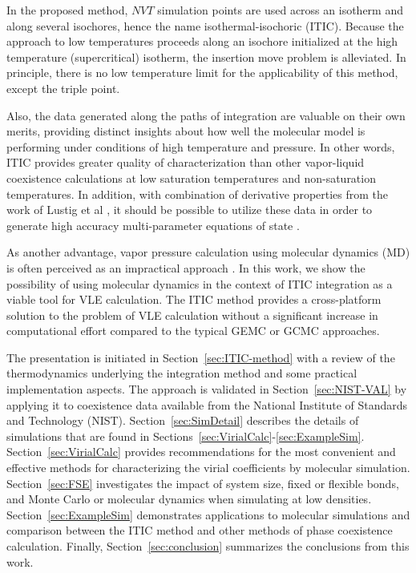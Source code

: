 \documentclass[5p,times]{elsarticle}
\begin{document}
In the proposed method, $NVT$ simulation points are used across an isotherm and along several isochores, hence the name isothermal-isochoric (ITIC). Because the approach to low temperatures proceeds along an isochore initialized at the high temperature (supercritical) isotherm, the insertion move problem is alleviated. In principle, there is no low temperature limit for the applicability of this method, except the triple point. 

Also, the data generated along the paths of integration are valuable on their own merits, providing distinct insights about how well the molecular model is performing under conditions of high temperature and pressure. In other words, ITIC provides greater quality of characterization than other vapor-liquid coexistence calculations at low saturation temperatures and non-saturation temperatures. In addition, with combination of derivative properties from the work of Lustig et al \cite{Lustig2015}, it should be possible to utilize these data in order to generate high accuracy multi-parameter equations of state \cite{Thol2016_LJ,Thol2016_siloxane,Thol2016_siloxane_first,Thol2017,Rutkai2013,Rutkai2015,Thol2015,Thol2015b}.

As another advantage, vapor pressure calculation using molecular dynamics (MD) is often perceived as an impractical approach \cite{Nieto-Draghi2015}. In this work, we show the possibility of using molecular dynamics in the context of ITIC integration as a viable tool for VLE calculation. The ITIC method provides a cross-platform solution to the problem of VLE calculation without a significant increase in computational effort compared to the typical GEMC or GCMC approaches.
 
The presentation is initiated in Section~\ref{sec:ITIC-method} with a review of the thermodynamics underlying the integration method and some practical implementation aspects. The approach is validated in Section~\ref{sec:NIST-VAL} by applying it to coexistence data available from the National Institute of Standards and Technology (NIST). Section~\ref{sec:SimDetail} describes the details of simulations that are found in Sections~\ref{sec:VirialCalc}-\ref{sec:ExampleSim}. Section~\ref{sec:VirialCalc} provides recommendations for the most convenient and effective methods for characterizing the virial coefficients by molecular simulation. Section~\ref{sec:FSE} investigates the impact of system size, fixed or flexible bonds, and Monte Carlo or molecular dynamics when simulating at low densities. Section~\ref{sec:ExampleSim} demonstrates applications to molecular simulations and comparison between the ITIC method and other methods of phase coexistence calculation. Finally, Section~\ref{sec:conclusion} summarizes the conclusions from this work.
\end{document}
